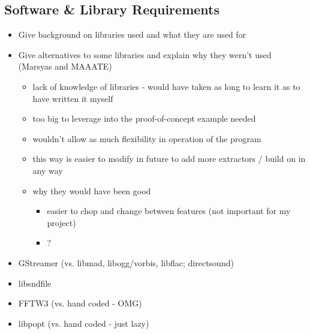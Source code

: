 \subsection{Software \& Library Requirements}
\begin{itemize}
	\item Give background on libraries used and what they are used for
	\item Give alternatives to some libraries and explain why they wern't used (Marsyas and MAAATE)
	\begin{itemize}
		\item lack of knowledge of libraries - would have taken as long to learn it as to have written it myself
		\item too big to leverage into the proof-of-concept example needed
		\item wouldn't allow as much flexibility in operation of the program
		\item this way is easier to modify in future to add more extractors / build on in any way
		\item why they would have been good
		\begin{itemize}
			\item easier to chop and change between features (not important for my project)
			\item ?
		\end{itemize}
	\end{itemize}
	\item GStreamer (vs. libmad, libogg/vorbis, libflac; directsound)
	\item libsndfile
	\item FFTW3 (vs. hand coded - OMG)
	\item libpopt (vs. hand coded - just lazy)
\end{itemize}
